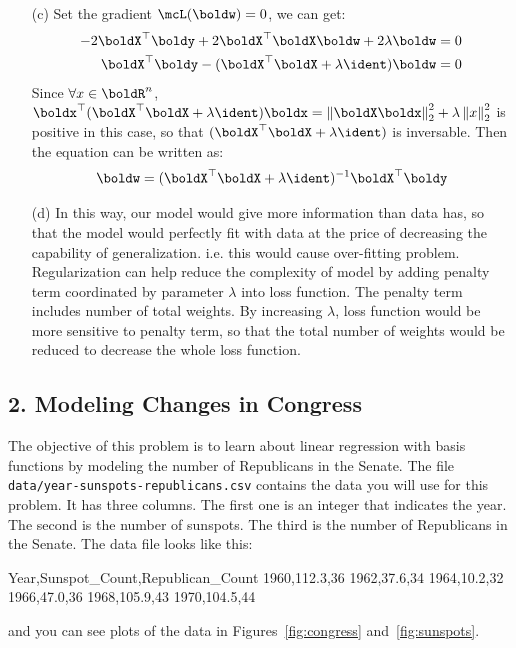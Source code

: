 \documentclass[submit]{harvardml}
\begin{document}
\begin{itemize}
\item[(c)] Set the gradient $\mcL(\boldw) = 0$, we can get:
\begin{align*}
-2\boldX^\top \boldy + 2\boldX^\top \boldX \boldw + 2 \lambda \boldw = 0\\
\boldX^\top \boldy - (\boldX^\top \boldX + \lambda \ident)\boldw = 0
 \end{align*}
Since $\forall x\in \boldR^{n}$, $\boldx^\top(\boldX^\top \boldX + \lambda \ident)\boldx = \left \| \boldX \boldx \right \|_{2}^{2} + \lambda \left \| x \right \|_{2}^{2}$ is positive in this case, so that $(\boldX^\top \boldX + \lambda \ident)$ is inversable. Then the equation can be written as:
\begin{align*}
\boldw = (\boldX^\top \boldX + \lambda \ident)^{-1} \boldX^\top \boldy
 \end{align*}

 \item[(d)] In this way, our model would give more information than data has, so that the model would perfectly fit with data at the price of decreasing the capability of generalization. i.e. this would cause over-fitting problem. Regularization can help reduce the complexity of model by adding penalty term coordinated by parameter $\lambda$ into loss function. The penalty term includes number of total weights. By increasing $\lambda$, loss function would be more sensitive to penalty term, so that the total number of weights would be reduced to decrease the whole loss function.
 
\end{itemize}
\newpage
\subsection*{2. Modeling Changes in Congress}
 The objective of this problem is to learn about linear regression
 with basis functions by modeling the number of Republicans in the
 Senate. The file \verb|data/year-sunspots-republicans.csv| contains the
 data you will use for this problem.  It has three columns.  The first
 one is an integer that indicates the year.  The second is the number
 of sunspots.  The third is the number of Republicans in the Senate.
 The data file looks like this:
 \begin{csv}
Year,Sunspot_Count,Republican_Count
1960,112.3,36
1962,37.6,34
1964,10.2,32
1966,47.0,36
1968,105.9,43
1970,104.5,44
\end{csv}
and you can see plots of the data in Figures~\ref{fig:congress}
and~\ref{fig:sunspots}. 
\end{document}
